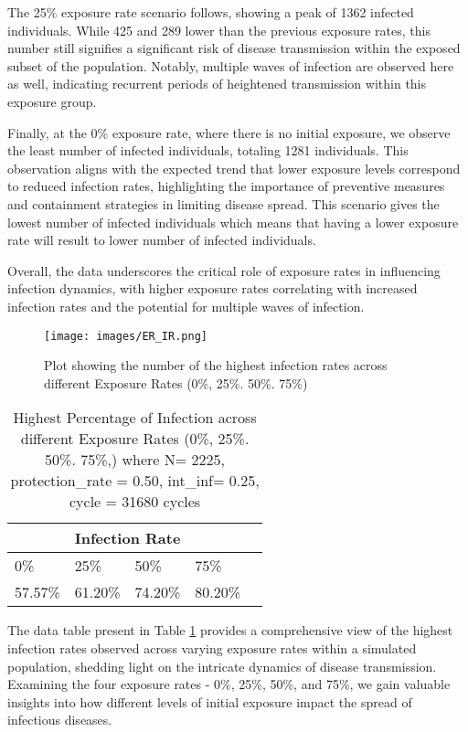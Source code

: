 The 25\% exposure rate scenario follows, showing a peak of 1362 infected individuals. While 425 and 289 lower than the previous exposure rates, this number still signifies a significant risk of disease transmission within the exposed subset of the population. Notably, multiple waves of infection are observed here as well, indicating recurrent periods of heightened transmission within this exposure group.

Finally, at the 0\% exposure rate, where there is no initial exposure, we observe the least number of infected individuals, totaling 1281 individuals. This observation aligns with the expected trend that lower exposure levels correspond to reduced infection rates, highlighting the importance of preventive measures and containment strategies in limiting disease spread. This scenario gives the lowest number of infected individuals which means that having a lower exposure rate will result to lower number of infected individuals.

Overall, the data underscores the critical role of exposure rates in influencing infection dynamics, with higher exposure rates correlating with increased infection rates and the potential for multiple waves of infection.
\begin{figure}[H]
	\centering
	\texttt{[image: images/ER\_IR.png]}
	\caption{Plot showing the number of the highest infection rates across different Exposure Rates (0\%, 25\%. 50\%. 75\%) }
	\label{fig:21}
\end{figure}

\begin{table}[H]
	\centering
	\begin{tabularx}{\textwidth}{|X|X|X|X|X|}
		\hline
		\multicolumn{4}{|c|}{\textbf{Infection Rate}} \\
		\hline
		0\%& 25\% & 50\% & 75\% \\
		\hline
		57.57\%& 61.20\% & 74.20\%  & 80.20\%\\
		\hline
	\end{tabularx}
	\caption{Highest Percentage of Infection across different Exposure Rates (0\%, 25\%. 50\%. 75\%,) where N= 2225, protection\_rate = 0.50, int\_inf= 0.25, cycle = 31680 cycles }
	\label{tab:ER_IR}
\end{table}     

The data table present in Table \ref{tab:ER_IR} provides a comprehensive view of the highest infection rates observed across varying exposure rates within a simulated population, shedding light on the intricate dynamics of disease transmission. Examining the four exposure rates - 0\%, 25\%, 50\%, and 75\%, we gain valuable insights into how different levels of initial exposure impact the spread of infectious diseases.

